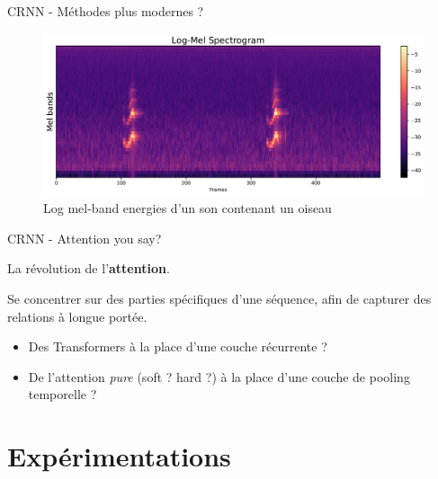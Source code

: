 \documentclass[compress,xcolor=table]{beamer}
\begin{document}
\begin{frame}{CRNN - Méthodes plus modernes ?}

    \begin{figure}[ht]
        \centering
        \includegraphics[width=\textwidth]{../images/audio/birds.melspectrogram.ff1010.pdf}
        \caption{Log mel-band energies d'un son contenant un oiseau}
        \label{fig:birds.melspectrogram.ff1010}
    \end{figure}

\end{frame}

\begin{frame}{CRNN - Attention you say?}

    La révolution de l'\textbf{attention}.

    \begin{block}{ \cite{attentionIsAllYouNeed}}
        Se concentrer sur des parties spécifiques d'une séquence, afin de capturer des relations à longue portée.

        \begin{itemize}
            \item Des Transformers à la place d'une couche récurrente ?
            \item De l'attention \textit{pure} (soft ? hard ?) à la place d'une couche de pooling temporelle ?
        \end{itemize}
    \end{block}

\end{frame}

\section{Expérimentations} \subsection{}
\end{document}
